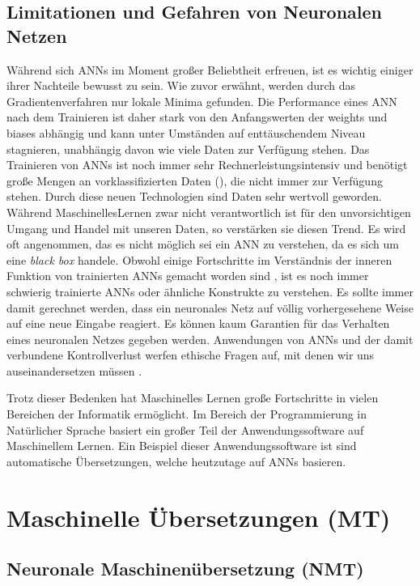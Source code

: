 \documentclass{thesisclass}
\begin{document}
\section{Limitationen und Gefahren von Neuronalen Netzen}
Während sich \gls{ANN}s im Moment großer Beliebtheit erfreuen, ist es wichtig einiger ihrer Nachteile bewusst zu sein. Wie zuvor erwähnt, werden durch das Gradientenverfahren nur lokale Minima gefunden. Die Performance eines \gls{ANN} nach dem Trainieren ist daher stark von den Anfangswerten der weights und biases abhängig und kann unter Umständen auf enttäuschendem Niveau stagnieren, unabhängig davon wie viele Daten zur Verfügung stehen. Das Trainieren von \gls{ANN}s ist noch immer sehr Rechnerleistungsintensiv und benötigt große Mengen an vorklassifizierten Daten (), die nicht immer zur Verfügung stehen.  Durch diese neuen Technologien sind Daten sehr wertvoll geworden. Während \gls{MaschinellesLernen} zwar nicht verantwortlich ist für den unvorsichtigen Umgang und Handel mit unseren Daten, so verstärken sie diesen Trend. Es wird oft angenommen, das es nicht möglich sei ein \gls{ANN} zu verstehen, da es sich um eine \textit{black box} handele. Obwohl einige Fortschritte im Verständnis der inneren Funktion von trainierten \gls{ANN}s gemacht worden sind \cite{lime}, ist es noch immer schwierig trainierte \gls{ANN}s oder ähnliche Konstrukte zu verstehen. Es sollte immer damit gerechnet werden, dass ein neuronales Netz auf völlig vorhergesehene Weise auf eine neue Eingabe reagiert. Es können kaum Garantien für das Verhalten eines neuronalen Netzes gegeben werden. Anwendungen von \gls{ANN}s und der damit verbundene Kontrollverlust werfen ethische Fragen auf, mit denen wir uns auseinandersetzen müssen \cite{gibbs_2018}.

Trotz dieser Bedenken hat Maschinelles Lernen große Fortschritte in vielen Bereichen der Informatik ermöglicht. Im Bereich der Programmierung in Natürlicher Sprache basiert ein großer Teil der Anwendungssoftware auf Maschinellem Lernen. Ein Beispiel dieser Anwendungssoftware ist sind automatische Übersetzungen, welche heutzutage auf \gls{ANN}s basieren.

\let\cleardoublepage\relax \chapter{Maschinelle Übersetzungen (\gls{MT})}

\section{Neuronale Maschinenübersetzung (\gls{NMT})}
\end{document}

